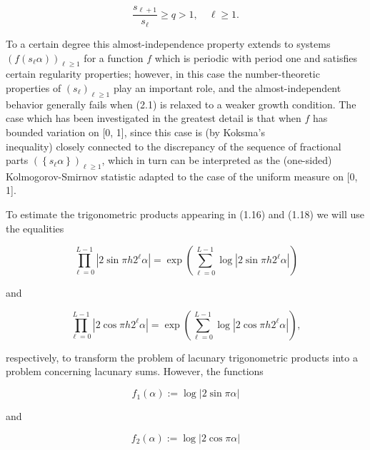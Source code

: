 \documentclass[10pt]{article}
\begin{document}
\begin{equation*}
\frac{s_{\ell+1}}{s_{\ell}} \geqslant q>1, \quad \ell \geqslant 1 . \tag{2.1}
\end{equation*}


To a certain degree this almost-independence property extends to systems $\left(f\left(s_{\ell} \alpha\right)\right)_{\ell \geqslant 1}$ for a function $f$ which is periodic with period one and satisfies certain regularity properties; however, in this case the number-theoretic properties of $\left(s_{\ell}\right)_{\ell \geqslant 1}$ play an important role, and the almost-independent behavior generally fails when (2.1) is relaxed to a weaker growth condition. The case which has been investigated in the greatest detail is that when $f$ has bounded variation on [0, 1], since this case is (by Koksma's\\
inequality) closely connected to the discrepancy of the sequence of fractional parts $\left(\left\{s_{\ell} \alpha\right\}\right)_{\ell \geqslant 1}$, which in turn can be interpreted as the (one-sided) Kolmogorov-Smirnov statistic adapted to the case of the uniform measure on [0, 1].

To estimate the trigonometric products appearing in (1.16) and (1.18) we will use the equalities


\begin{equation*}
\prod_{\ell=0}^{L-1}\left|2 \sin \pi h 2^{\ell} \alpha\right|=\exp \left(\sum_{\ell=0}^{L-1} \log \left|2 \sin \pi h 2^{\ell} \alpha\right|\right) \tag{2.2}
\end{equation*}


and


\begin{equation*}
\prod_{\ell=0}^{L-1}\left|2 \cos \pi h 2^{\ell} \alpha\right|=\exp \left(\sum_{\ell=0}^{L-1} \log \left|2 \cos \pi h 2^{\ell} \alpha\right|\right), \tag{2.3}
\end{equation*}


respectively, to transform the problem of lacunary trigonometric products into a problem concerning lacunary sums. However, the functions


\begin{equation*}
f_{1}(\alpha):=\log |2 \sin \pi \alpha| \tag{2.4}
\end{equation*}


and


\begin{equation*}
f_{2}(\alpha):=\log |2 \cos \pi \alpha| \tag{2.5}
\end{equation*}
\end{document}
